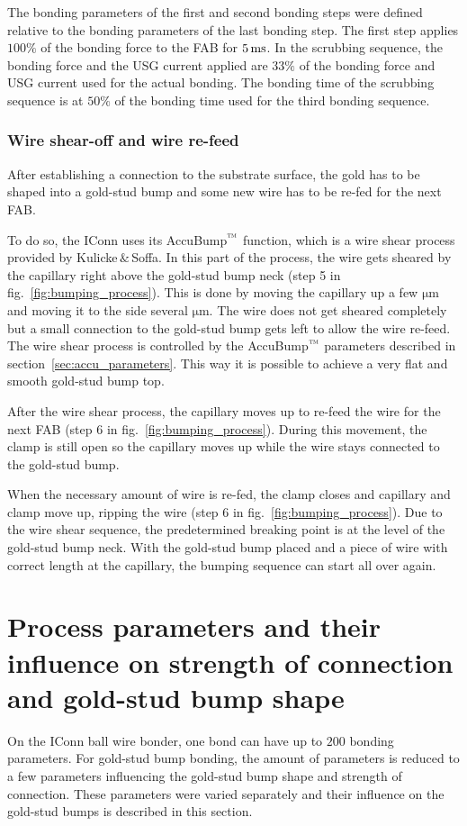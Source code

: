 The bonding parameters of the first and second bonding steps were defined relative to the bonding parameters of the last bonding step. The first step applies $100\%$ of the bonding force to the \ac{FAB} for $5\,\rm{ms}$. In the scrubbing sequence, the bonding force and the \ac{USG} current applied are $33\%$ of the bonding force and \ac{USG} current used for the actual bonding. The bonding time of the scrubbing sequence is at $50\%$ of the bonding time used for the third bonding sequence.
 


\subsubsection{Wire shear-off and wire re-feed}
After establishing a connection to the substrate surface, the gold has to be shaped into a gold-stud bump and some new wire has to be re-fed for the next \ac{FAB}.

To do so, the IConn uses its AccuBump$\rm{\symbTM}$ function, which is a wire shear process provided by Kulicke$\,\&\,$Soffa. In this part of the process, the wire gets sheared by the capillary right above the gold-stud bump neck (step 5 in fig.~\ref{fig:bumping_process}). This is done by moving the capillary up a few $\si{\micro \meter}$ and moving it to the side several $\si{\micro \meter}$. The wire does not get sheared completely but a small connection to the gold-stud bump gets left to allow the wire re-feed. The wire shear process is controlled by the AccuBump$\rm{\symbTM}$ parameters described in section~\ref{sec:accu_parameters}. This way it is possible to achieve a very flat and smooth gold-stud bump top.

After the wire shear process, the capillary moves up to re-feed the wire for the next \ac{FAB} (step 6 in fig.~\ref{fig:bumping_process}). During this movement, the clamp is still open so the capillary moves up while the wire stays connected to the gold-stud bump.

When the necessary amount of wire is re-fed, the clamp closes and capillary and clamp move up, ripping the wire (step 6 in fig.~\ref{fig:bumping_process}). Due to the wire shear sequence, the predetermined breaking point is at the level of the gold-stud bump neck. With the gold-stud bump placed and a piece of wire with correct length at the capillary, the bumping sequence can start all over again.

\section[Process parameters, strength of connection and bump shape]{Process parameters and their influence on strength of connection and gold-stud bump shape}\label{sec:mech_strength}
On the IConn ball wire bonder, one bond can have up to $200$ bonding parameters. For gold-stud bump bonding, the amount of parameters is reduced to a few parameters influencing the gold-stud bump shape and strength of connection. These parameters were varied separately and their influence on the gold-stud bumps is described in this section.

